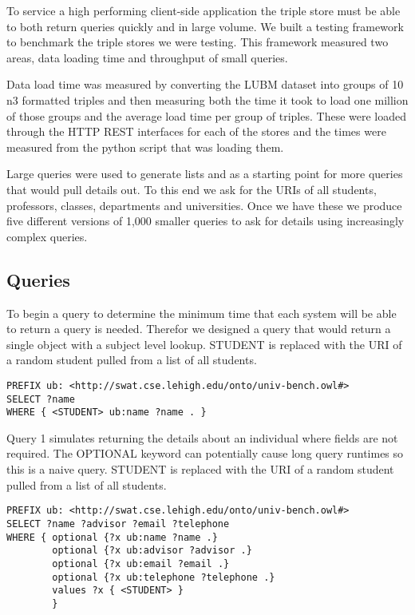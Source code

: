 \documentclass{llncs}
\begin{document}
To service a high performing client-side application the triple store must be able to both return queries quickly and in large volume.  We built a testing framework to benchmark the triple stores we were testing.  This framework measured two areas, data loading time and throughput of small queries.

Data load time was measured by converting the LUBM dataset into groups of 10 n3 formatted triples and then measuring both the time it took to load one million of those groups and the average load time per group of triples.  These were loaded through the HTTP REST interfaces for each of the stores and the times were measured from the python script that was loading them.

Large queries were used to generate lists and as a starting point for more queries that would pull details out.  To this end we ask for the URIs of all students, professors, classes, departments and universities.  Once we have these we produce five different versions of 1,000 smaller queries to ask for details using increasingly complex queries.

\subsection{Queries}
To begin a query to determine the minimum time that each system will be able to return a query is needed.  Therefor we designed a query that would return a single object with a subject level lookup.  STUDENT is replaced with the URI of a random student pulled from a list of all students.

\begin{lstlisting}[caption=Benchmark Query]
PREFIX ub: <http://swat.cse.lehigh.edu/onto/univ-bench.owl#>
SELECT ?name
WHERE { <STUDENT> ub:name ?name . }
\end{lstlisting}

\smallskip

Query 1 simulates returning the details about an individual where fields are not required.  The OPTIONAL keyword can potentially cause long query runtimes so this is a naive query.  STUDENT is replaced with the URI of a random student pulled from a list of all students.

\begin{lstlisting}[caption=Query 1]
PREFIX ub: <http://swat.cse.lehigh.edu/onto/univ-bench.owl#>
SELECT ?name ?advisor ?email ?telephone
WHERE { optional {?x ub:name ?name .}
        optional {?x ub:advisor ?advisor .}
        optional {?x ub:email ?email .}
        optional {?x ub:telephone ?telephone .}
        values ?x { <STUDENT> }
        }
\end{lstlisting}
\end{document}

